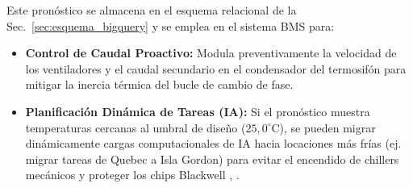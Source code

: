 Este pron\'ostico se almacena en el esquema relacional de la Sec.~\ref{sec:esquema_bigquery} y se emplea en el sistema BMS para:
\begin{itemize}
    \item \textbf{Control de Caudal Proactivo:} Modula preventivamente la velocidad de los ventiladores y el caudal secundario en el condensador del termosif\'on para mitigar la inercia t\'ermica del bucle de cambio de fase.
    \item \textbf{Planificaci\'on Din\'amica de Tareas (IA):} Si el pron\'ostico muestra temperaturas cercanas al umbral de diseño ($25,0^\circ\text{C}$), se pueden migrar din\'amicamente cargas computacionales de IA hacia locaciones m\'as fr\'ias (ej. migrar tareas de Quebec a Isla Gordon) para evitar el encendido de chillers mec\'anicos y proteger los chips Blackwell \cite{google2014}, \cite{bhardwaj2021}.
\end{itemize}

